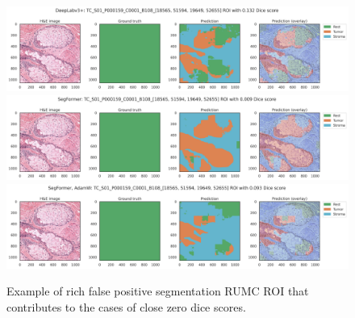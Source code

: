 \begin{figure}[H]
    \includegraphics[width=\linewidth]{figures/tissue/deeplabv3+_dice_tc_TC_S01_P000159_C0001_B108_[18565,_51594,_19649,_52655]_check.png}
    \includegraphics[width=\linewidth]{figures/tissue/segformer_dice_tc_TC_S01_P000159_C0001_B108_[18565,_51594,_19649,_52655]_check.png}
    \includegraphics[width=\linewidth]{figures/tissue/segformer,_adamw_dice_tc_TC_S01_P000159_C0001_B108_[18565,_51594,_19649,_52655]_check.png}
    \caption{Example of rich false positive segmentation RUMC ROI that contributes to the cases of close zero dice scores.}
    \label{fig:TC_S01_P000159}
\end{figure}


